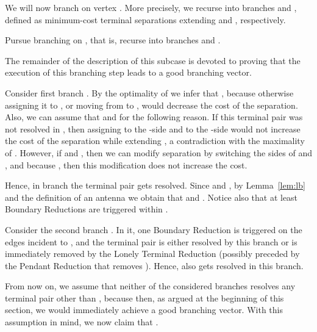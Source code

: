 We will now branch on vertex . More precisely, we recurse into branches  and , defined as minimum-cost terminal separations extending  and , respectively.

\begin{branching}
Pursue branching on , that is, recurse into branches  and .
\end{branching}

The remainder of the description of this subcase is devoted to proving that the execution of this branching step leads to a good branching vector.

Consider first branch . By the optimality of  we infer that , because otherwise assigning it to , or moving from  to , would decrease the cost of the separation. Also, we can assume that  and  for the following reason. If this terminal pair was not resolved in , then assigning  to the -side and  to the -side would not increase the cost of the separation while extending , a contradiction with the maximality of . However, if  and , then we can modify separation  by switching the sides of  and , and because , then this modification does not increase the cost. 

Hence, in branch  the terminal pair  gets resolved. Since  and , by Lemma~\ref{lem:lb} and the definition of an antenna we obtain that  and . Notice also that at least  Boundary Reductions are triggered within .

Consider the second branch . In it, one Boundary Reduction is triggered on the edges incident to , and the terminal pair  is either resolved by this branch or is immediately removed by the Lonely Terminal Reduction (possibly preceded by the Pendant Reduction that removes ). Hence,  also gets resolved in this branch.

From now on, we assume that neither of the considered branches resolves any terminal pair other than , because then, as argued at the beginning of this section, we would immediately achieve a good branching vector. With this assumption in mind, we now claim that . 

